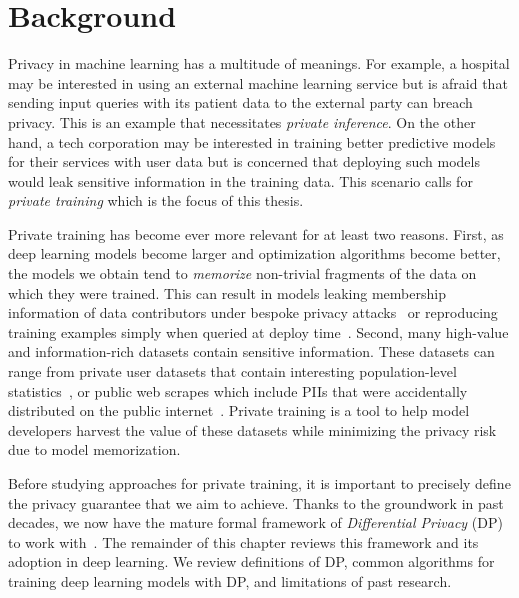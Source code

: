 \chapter{Background}\label{ch_2}

Privacy in machine learning has a multitude of meanings.
For example, a hospital may be interested in using an external machine learning service but is afraid that sending input queries with its patient data to the external party can breach privacy.
This is an example that necessitates \emph{private inference}.
On the other hand, a tech corporation may be interested in training better predictive models for their services with user data but is concerned that deploying such models would leak sensitive information in the training data.
This scenario calls for \emph{private training} which is the focus of this thesis. 

Private training has become ever more relevant for at least two reasons. 
First, as deep learning models become larger and optimization algorithms become better, the models we obtain tend to \emph{memorize} non-trivial fragments of the data on which they were trained.
This can result in models leaking membership information of data contributors under bespoke privacy attacks~\cite{shokri2017membership} or reproducing training examples simply when queried at deploy time~\cite{carlini2020extracting,nasr2023scalable}.
Second, many high-value and information-rich datasets contain sensitive information.
These datasets can range from private user datasets that contain interesting population-level statistics~\cite{google-2019}, or public web scrapes which include PIIs that were accidentally distributed on the public internet~\cite{carlini2020extracting}.
Private training is a tool to help model developers harvest the value of these datasets while minimizing the privacy risk due to model memorization.

Before studying approaches for private training, it is important to precisely define the privacy guarantee that we aim to achieve.
Thanks to the groundwork in past decades, we now have the mature formal framework of \emph{Differential Privacy} (DP) to work with~\cite{dwork2006calibrating,dwork2014algorithmic}.
The remainder of this chapter reviews this framework and its adoption in deep learning.
We review definitions of DP, common algorithms for training deep learning models with DP, and limitations of past research.

